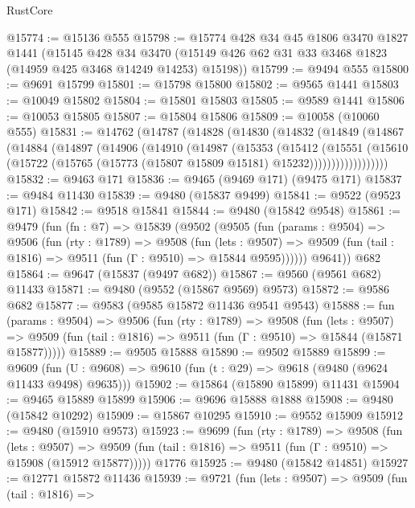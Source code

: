 \begin{lexlean}{RustCore}
\begin{coremodule}
@15774 := @15136 @555
@15798 := @15774
    @428
    @34
    @45
    @1806
    @3470
    @1827
    @1441
    (@15145
      @428
      @34
      @3470
      (@15149 @426 @62 @31 @33 @3468 @1823 (@14959 @425 @3468 @14249 @14253) @15198))
@15799 := @9494 @555
@15800 := @9691 @15799
@15801 := @15798 @15800
@15802 := @9565 @1441
@15803 := @10049 @15802
@15804 := @15801 @15803
@15805 := @9589 @1441
@15806 := @10053 @15805
@15807 := @15804 @15806
@15809 := @10058 (@10060 @555)
@15831 := @14762
    (@14787
      (@14828
        (@14830
          (@14832
            (@14849
              (@14867
                (@14884
                  (@14897
                    (@14906
                      (@14910
                        (@14987
                          (@15353
                            (@15412
                              (@15551
                                (@15610
                                  (@15722
                                    (@15765 (@15773 (@15807 @15809 @15181) @15232))))))))))))))))))
@15832 := @9463 @171
@15836 := @9465 (@9469 @171) (@9475 @171)
@15837 := @9484 @11430
@15839 := @9480 (@15837 @9499)
@15841 := @9522 (@9523 @171)
@15842 := @9518 @15841
@15844 := @9480 (@15842 @9548)
@15861 := @9479
    (fun (fn : @7) =>
    @15839
      (@9502
        (@9505
          (fun (params : @9504) =>
          @9506
            (fun (rty : @1789) =>
            @9508
              (fun (lets : @9507) =>
              @9509 (fun (tail : @1816) => @9511 (fun (Γ : @9510) => @15844 @9595))))))
        @9641))
    @682
@15864 := @9647 (@15837 (@9497 @682))
@15867 := @9560 (@9561 @682) @11433
@15871 := @9480 (@9552 (@15867 @9569) @9573)
@15872 := @9586 @682
@15877 := @9583 (@9585 @15872 @11436 @9541 @9543)
@15888 := fun (params : @9504) =>
  @9506
    (fun (rty : @1789) =>
    @9508
      (fun (lets : @9507) =>
      @9509 (fun (tail : @1816) => @9511 (fun (Γ : @9510) => @15844 (@15871 @15877)))))
@15889 := @9505 @15888
@15890 := @9502 @15889
@15899 := @9609
    (fun (U : @9608) => @9610 (fun (t : @29) => @9618 (@9480 (@9624 @11433 @9498) @9635)))
@15902 := @15864 (@15890 @15899) @11431
@15904 := @9465 @15889 @15899
@15906 := @9696 @15888 @1888
@15908 := @9480 (@15842 @10292)
@15909 := @15867 @10295
@15910 := @9552 @15909
@15912 := @9480 (@15910 @9573)
@15923 := @9699
    (fun (rty : @1789) =>
    @9508
      (fun (lets : @9507) =>
      @9509 (fun (tail : @1816) => @9511 (fun (Γ : @9510) => @15908 (@15912 @15877)))))
    @1776
@15925 := @9480 (@15842 @14851)
@15927 := @12771 @15872 @11436
@15939 := @9721
    (fun (lets : @9507) =>
    @9509
      (fun (tail : @1816) =>

\end{coremodule}
\end{lexlean}
